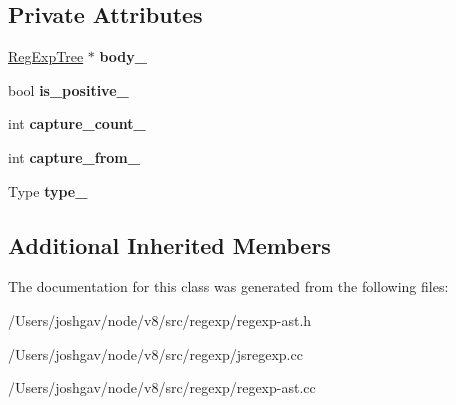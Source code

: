 \subsection*{Private Attributes}
\begin{DoxyCompactItemize}
\item 
\hyperlink{classv8_1_1internal_1_1_reg_exp_tree}{Reg\+Exp\+Tree} $\ast$ {\bfseries body\+\_\+}\hypertarget{classv8_1_1internal_1_1_reg_exp_lookaround_a84bf4c204d9f441b1195239af8a49d90}{}\label{classv8_1_1internal_1_1_reg_exp_lookaround_a84bf4c204d9f441b1195239af8a49d90}

\item 
bool {\bfseries is\+\_\+positive\+\_\+}\hypertarget{classv8_1_1internal_1_1_reg_exp_lookaround_a8e3996d7e11bf906276b43a988c333e6}{}\label{classv8_1_1internal_1_1_reg_exp_lookaround_a8e3996d7e11bf906276b43a988c333e6}

\item 
int {\bfseries capture\+\_\+count\+\_\+}\hypertarget{classv8_1_1internal_1_1_reg_exp_lookaround_a0db42f1f9e7b9ff3c8b947c49dd0c8b5}{}\label{classv8_1_1internal_1_1_reg_exp_lookaround_a0db42f1f9e7b9ff3c8b947c49dd0c8b5}

\item 
int {\bfseries capture\+\_\+from\+\_\+}\hypertarget{classv8_1_1internal_1_1_reg_exp_lookaround_a979e61649178c1cba85f66ad25708048}{}\label{classv8_1_1internal_1_1_reg_exp_lookaround_a979e61649178c1cba85f66ad25708048}

\item 
Type {\bfseries type\+\_\+}\hypertarget{classv8_1_1internal_1_1_reg_exp_lookaround_a2c593a36466a230df07168d2d81ed050}{}\label{classv8_1_1internal_1_1_reg_exp_lookaround_a2c593a36466a230df07168d2d81ed050}

\end{DoxyCompactItemize}
\subsection*{Additional Inherited Members}


The documentation for this class was generated from the following files\+:\begin{DoxyCompactItemize}
\item 
/\+Users/joshgav/node/v8/src/regexp/regexp-\/ast.\+h\item 
/\+Users/joshgav/node/v8/src/regexp/jsregexp.\+cc\item 
/\+Users/joshgav/node/v8/src/regexp/regexp-\/ast.\+cc\end{DoxyCompactItemize}
